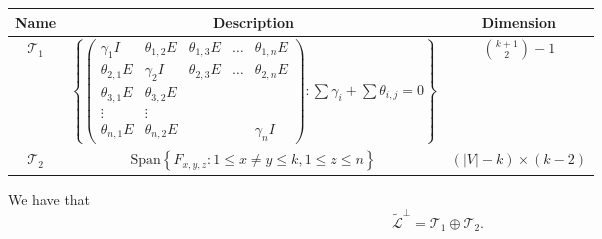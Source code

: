 \begin{table}[h]
\centering
\begin{tabular}{|c|c|c|}
\hline
Name & Description & Dimension \\
\hline \hline
$\mathcal{T}_{1}$ & $ \left \{ \left( \begin{array}{c|c|c|c|c} \gamma_1 I & \theta_{1,2} E & \theta_{1,3} E & \ldots & \theta_{1,n} E \\ \hline \theta_{2,1} E & \gamma_2 I & \theta_{2,3} E & \ldots & \theta_{2,n} E \\ \hline \theta_{3,1} E & \theta_{3,2} E & & & \\ \hline \vdots & \vdots & & & \\ \hline \theta_{n,1} E & \theta_{n,2} E & & & \gamma_n I \end{array}\right) : \sum \gamma_i + \sum \theta_{i,j} = 0 \right\}$ & ${k+1 \choose 2}-1$ \\ \hline
$\mathcal{T}_{2} $ & $ \mathrm{Span} \left\{ F_{x,y,z} : 1 \leq x \neq y \leq k, 1\leq z \leq n \right\}$ & $(|V| - k) \times (k-2)$ \\ \hline
\end{tabular}
\end{table}

\begin{proposition} \label{thm:description_of_lperp} We have that 
$$\tilde{\mathcal{L}}^\perp=\mathcal{T}_{1}\oplus \mathcal{T}_{2}.$$
 
\end{proposition}


